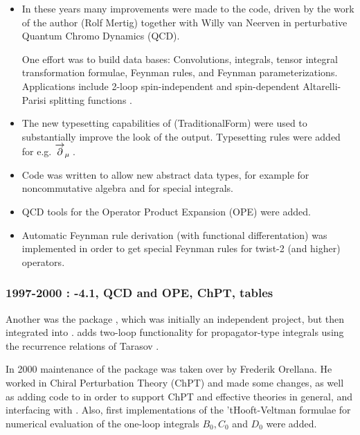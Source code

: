 \begin{itemize}

\item
In these years many improvements were made to the code, driven by the work of the author (Rolf Mertig) 
together with Willy van Neerven in perturbative Quantum Chromo Dynamics (QCD).

One effort was to build data bases: Convolutions, integrals, tensor integral transformation
formulae, Feynman rules,
and Feynman parameterizations. 
Applications include 2-loop spin-independent and spin-dependent Altarelli-Parisi splitting
functions \cite{Altarelli:1977zs}.

\item The new typesetting capabilities of  (TraditionalForm) were used to substantially
improve the look of the output.
Typesetting rules were added for e.g. \({\overvar{\partial }{\rightarrow}}_{\mu } \multsp \).

\item Code was written to allow new abstract data types, for example for noncommutative algebra
 and for special integrals.

\item QCD tools for the Operator Product Expansion  (OPE)
were added.

\item Automatic Feynman rule derivation (with functional
differentation) was implemented in order to get special Feynman rules
for twist-2 (and higher) operators.

\end{itemize}

\subsubsection*{1997-2000 : -4.1, QCD and OPE, ChPT, tables}

Another was the package \tarcer, which was initially an independent project, but then integrated
into \fc.  \tarcer \cite{Mertig:1998vk} adds two-loop functionality for propagator-type integrals
using the recurrence relations of Tarasov \cite{Tarasov:1997kx}.

In 2000 maintenance of the package was taken over by Frederik Orellana.
He worked in Chiral Perturbation Theory \cite{Gasser:1984gg} (ChPT) and made some changes, as well
as adding code to \fc in order to support ChPT and effective theories in general, and interfacing
with \fa. Also, first implementations of the 'tHooft-Veltman formulae \cite{'tHooft:1978xw} for
numerical evaluation of the one-loop integrals $B_0, C_0$ and $D_0$ were added. 

